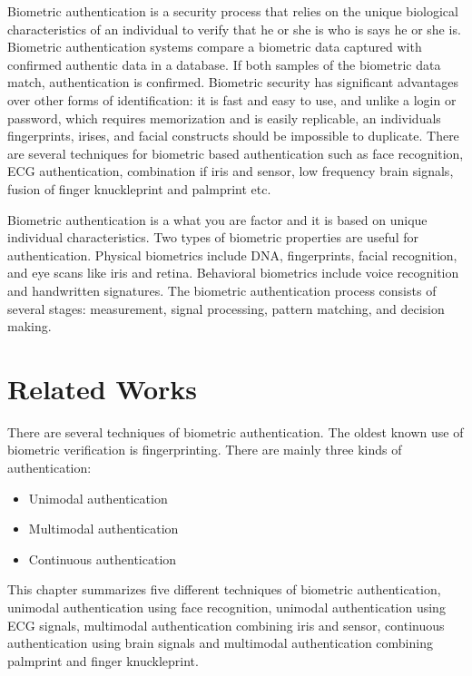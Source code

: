 \documentclass[10pt,a4paper,journal]{IEEEtran}
\begin{document}
\hspace{2em} Biometric authentication is a security process that relies on the unique biological characteristics of an individual to verify that he or she is who is says he or she is. Biometric authentication systems compare a biometric data captured with confirmed authentic data in a database. If both samples of the biometric data match, authentication is confirmed. Biometric security has significant advantages over other forms of identification: it is fast and easy to use, and unlike a login or password, which requires memorization and is easily replicable, an individuals fingerprints, irises, and facial constructs should be impossible to duplicate. There are several techniques for biometric based authentication such as face recognition, ECG authentication, combination if iris and sensor, low frequency brain signals, fusion of finger knuckleprint and palmprint etc.

\hspace{2em} Biometric authentication is a what you are factor and  it is based on unique individual characteristics. Two types of biometric properties are useful for authentication. Physical biometrics include DNA, fingerprints, facial recognition, and eye scans like iris and retina. Behavioral biometrics include voice recognition and handwritten signatures. The biometric authentication process consists of several stages: measurement, signal processing, pattern matching, and decision making. 

\section{Related Works}

\hspace{2em} There are several techniques of biometric authentication. The oldest known use of biometric verification is fingerprinting.  There are mainly three kinds of authentication:
\begin{itemize}
\item Unimodal authentication
\item Multimodal authentication
\item Continuous authentication
\end{itemize}

\hspace{2em} This chapter summarizes five different techniques of biometric authentication, unimodal authentication using face recognition, unimodal authentication using ECG signals, multimodal authentication combining iris and sensor, continuous authentication using brain signals and multimodal authentication combining palmprint and finger knuckleprint.
\end{document}
